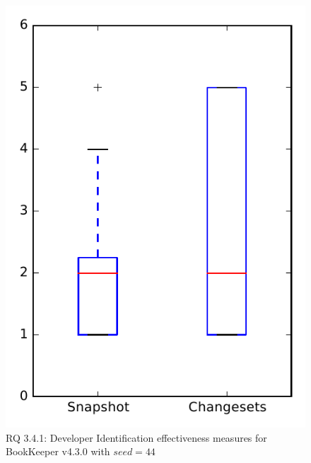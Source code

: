 
\begin{figure}
\centering
\includegraphics[height=0.4\textheight]{figures/dit_seed/rq1_bookkeeper_44}
\caption{RQ 3.4.1: Developer Identification effectiveness measures for BookKeeper v4.3.0 with $seed=44$}
\label{fig:dit_seed:rq1:bookkeeper}
\end{figure}
